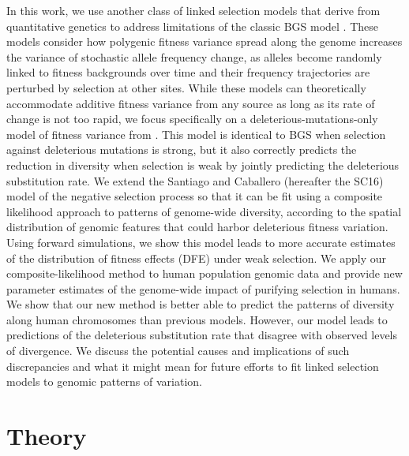 \documentclass[11pt]{article}
\begin{document}
In this work, we use another class of linked selection models that derive from
quantitative genetics to address limitations of the classic BGS model \parencite{Santiago1998-bs, Santiago2016-mu,Santiago1995-hx,Robertson1961-ho}.
These models consider how polygenic fitness variance spread along the genome increases the variance of stochastic allele frequency change, as alleles become randomly linked to fitness backgrounds over time and their frequency trajectories are perturbed by selection at other sites. While these models can theoretically accommodate additive fitness variance from any source as long as its rate of change is not too rapid, we focus
specifically on a deleterious-mutations-only model of fitness variance from
\textcite{Santiago2016-mu}. This model is identical to BGS when selection
against deleterious mutations is strong, but it also correctly predicts the
reduction in diversity when selection is weak by jointly predicting the
deleterious substitution rate. We extend the Santiago and Caballero (hereafter
the SC16) model of the negative selection process so that it can be fit using a composite likelihood approach to patterns of genome-wide diversity, according to the spatial distribution of genomic features that could harbor deleterious fitness variation. Using forward simulations, we show this model leads to more accurate estimates of the distribution of fitness effects (DFE) under weak selection. We apply our
composite-likelihood method to human population genomic data and provide new
parameter estimates of the genome-wide impact of purifying selection in humans. 
We show that our new method is better able to predict the patterns of diversity along human chromosomes than previous models. 
However, our model leads to predictions of the deleterious substitution rate that disagree with observed levels of divergence. We discuss the potential causes and implications of such discrepancies and what it might mean for future efforts to fit linked selection models to genomic patterns of variation.

\section*{Theory}
\end{document}
